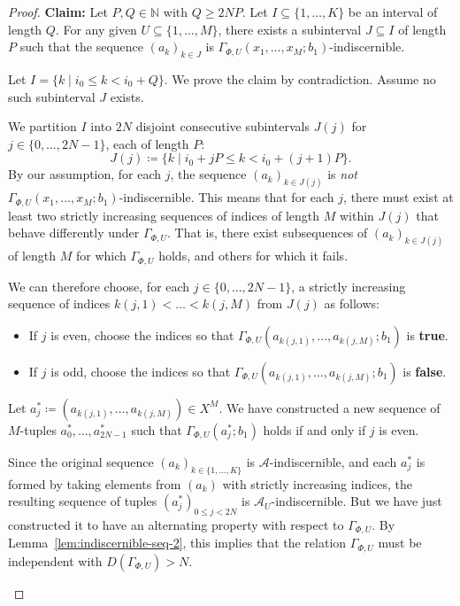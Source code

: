 \begin{proof}
    \textbf{Claim:} Let $P, Q \in \mathbb{N}$ with $Q \geq 2NP$. Let $I \subseteq \{1, \dots, K\}$ be an interval of length $Q$. For any given $U \subseteq \{1, \dots, M\}$, there exists a subinterval $J \subseteq I$ of length $P$ such that the sequence $(a_k)_{k \in J}$ is $\Gamma_{\Phi,U}(x_1, \dots, x_M ; b_1)$-indiscernible.

    \begin{subproof}

        Let $I = \{k \mid i_0 \leq k < i_0 + Q\}$. We prove the claim by contradiction. Assume no such subinterval $J$ exists.

        We partition $I$ into $2N$ disjoint consecutive subintervals $J(j)$ for $j \in \{0, \dots, 2N-1\}$, each of length $P$:
        \[
            J(j) \coloneq \{k \mid i_0 + jP \leq k < i_0 + (j+1)P\}.
        \]
        By our assumption, for each $j$, the sequence $(a_k)_{k \in J(j)}$ is \emph{not} $\Gamma_{\Phi,U}(x_1, \dots, x_M ; b_1)$-indiscernible. This means that for each $j$, there must exist at least two strictly increasing sequences of indices of length $M$ within $J(j)$ that behave differently under $\Gamma_{\Phi,U}$. That is, there exist subsequences of $(a_k)_{k \in J(j)}$ of length $M$ for which $\Gamma_{\Phi,U}$ holds, and others for which it fails.

        We can therefore choose, for each $j \in \{0, \dots, 2N-1\}$, a strictly increasing sequence of indices $k(j,1) < \dots < k(j,M)$ from $J(j)$ as follows:
        \begin{itemize}
            \item If $j$ is even, choose the indices so that $\Gamma_{\Phi,U}(a_{k(j,1)}, \dots, a_{k(j,M)}; b_1)$ is \textbf{true}.
            \item If $j$ is odd, choose the indices so that $\Gamma_{\Phi,U}(a_{k(j,1)}, \dots, a_{k(j,M)}; b_1)$ is \textbf{false}.
        \end{itemize}
        Let $a_j^* \coloneq (a_{k(j,1)}, \dots, a_{k(j,M)}) \in X^M$. We have constructed a new sequence of $M$-tuples $a_0^*, \dots, a_{2N-1}^*$ such that $\Gamma_{\Phi,U}(a_j^*; b_1)$ holds if and only if $j$ is even.

        Since the original sequence $(a_k)_{k \in \{1,\dots,K\}}$ is $\mathcal{A}$-indiscernible, and each $a_j^*$ is formed by taking elements from $(a_k)$ with strictly increasing indices, the resulting sequence of tuples $(a_j^*)_{0 \le j < 2N}$ is $\mathcal{A}_U$-indiscernible. But we have just constructed it to have an alternating property with respect to $\Gamma_{\Phi,U}$. By Lemma~\ref{lem:indiscernible-seq-2}, this implies that the relation $\Gamma_{\Phi,U}$ must be independent with $D(\Gamma_{\Phi,U}) > N$.


\end{subproof}
\end{proof}
